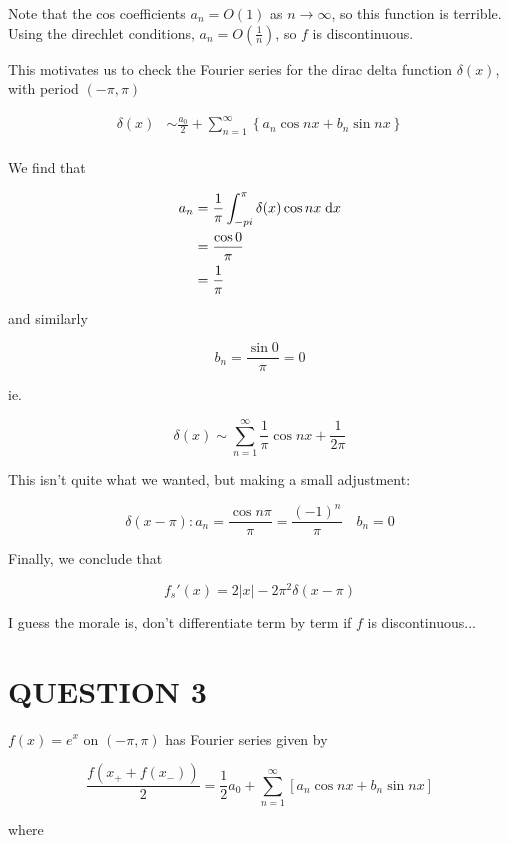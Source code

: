 \documentclass[a4paper]{article}
\begin{document}
Note that the cos coefficients $ a_{n} = O(1) $ as $ n \to \infty $, so this function is terrible. Using the direchlet conditions, $ a_{n} = O(\frac{1}{n})  $, so $ f $ is discontinuous. 

This motivates us to check the Fourier series for the dirac delta function $ \delta(x) $, with period $ (- \pi, \pi) $

\begin{align*}
\delta (x) & \sim \frac{a_{0}}{2} + \sum_{n=1}^{\infty}  \left\{  a_{n} \cos n x + b_{n} \sin n x \right\}   \\
\end{align*} 

We find that

\begin{align*}
a_{n} & = \frac{1}{\pi} \int_{-pi}^{\pi} \delta(x) \cos n x \; \mathrm{d} x  \\
& = \frac{\cos 0}{\pi}\\
&  = \frac{1}{\pi}
\end{align*}

and similarly

\[ b_{n} = \frac{\sin 0}{\pi} = 0  \]

ie.

\[ \delta(x) \sim \sum_{n=1}^{\infty}  \frac{1}{\pi} \cos n x + \frac{1}{2 \pi}   \]

This isn't quite what we wanted, but making a small adjustment:

\[ \delta(x - \pi): a_{n} = \frac{\cos n \pi}{\pi} = \frac{(-1)^{n}}{\pi}  \quad b_{n} = 0\]

Finally, we conclude that

\[ f_{s}'(x) = 2 | x |  - 2 \pi^{2}  \delta(x - \pi) \]

I guess the morale is, don't differentiate term by term if $ f $ is discontinuous...




\section{QUESTION 3}


$ f(x) = e^{x} $ on $ (-\pi,\pi) $ has Fourier series given by 


\[ \frac{f(x_{+} + f(x_{-}))}{2} = \frac{1}{2} a_{0} + \sum_{n=1}^{\infty} \left[ a_{n} \cos n x + b_{n} \sin n x  \right]  \]


where 
\end{document}
